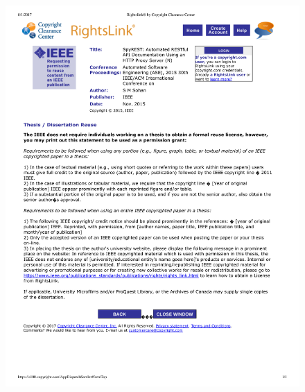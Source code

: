 \begin{figure}
 \centering
 \includegraphics[width=\textwidth]{copyrights/spy_rest.pdf}
\end{figure}
